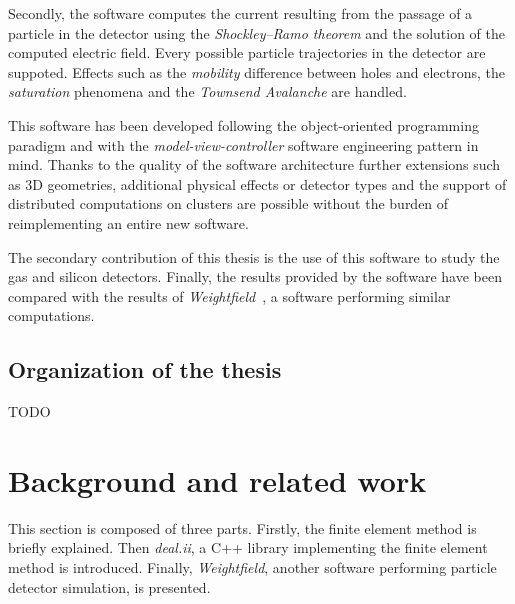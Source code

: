 \documentclass[11pt]{article}
\begin{document}
	Secondly, the software computes the current resulting from the passage of a particle
	in the detector using the \textit{Shockley–Ramo theorem} and the solution of the
	computed electric field. Every possible particle trajectories in the detector
	are suppoted. Effects such as the \textit{mobility} difference between holes and
	electrons, the \textit{saturation} phenomena and the \textit{Townsend Avalanche}
	are handled.

	This software has been developed following the object-oriented
	programming paradigm and with the \textit{model-view-controller}
	software engineering pattern in mind. Thanks to the quality of the software
	architecture further extensions such as 3D geometries, additional physical effects or
	detector types and the support of distributed computations on clusters are possible
	without the burden of reimplementing an entire new software.

	The secondary contribution of this thesis is the use of this software to study
	the gas and silicon detectors. Finally, the results provided by the
	software have been compared with the results of \textit{Weightfield}~\cite{Cenna2015}, a
	software performing similar computations.


	\subsection*{Organization of the thesis}

	TODO



\section{Background and related work}

This section is composed of three parts. Firstly,
 the finite element method is briefly explained. Then \textit{deal.ii},
 a C++ library implementing the finite element method is introduced. Finally,
 \textit{Weightfield}, another software performing particle detector simulation,
 is presented.
\end{document}
